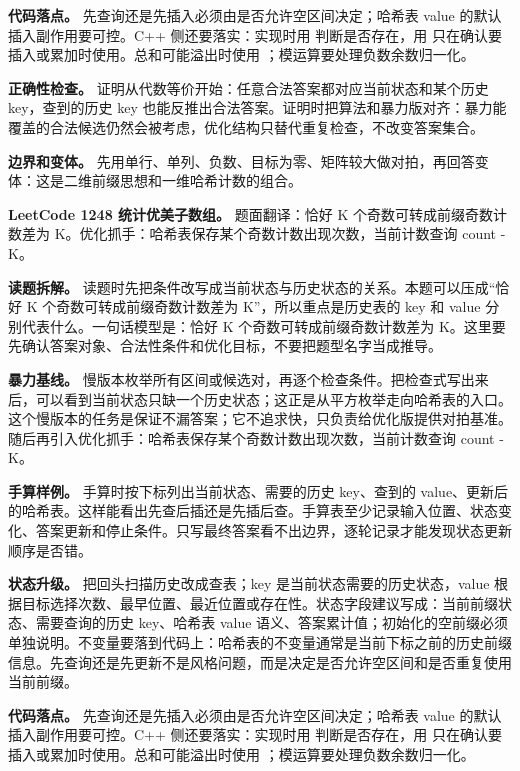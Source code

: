\textbf{代码落点。} 先查询还是先插入必须由是否允许空区间决定；哈希表 value 的默认插入副作用要可控。C++ 侧还要落实：实现时用  判断是否存在，用  只在确认要插入或累加时使用。总和可能溢出时使用 ；模运算要处理负数余数归一化。

\textbf{正确性检查。} 证明从代数等价开始：任意合法答案都对应当前状态和某个历史 key，查到的历史 key 也能反推出合法答案。证明时把算法和暴力版对齐：暴力能覆盖的合法候选仍然会被考虑，优化结构只替代重复检查，不改变答案集合。

\textbf{边界和变体。} 先用单行、单列、负数、目标为零、矩阵较大做对拍，再回答变体：这是二维前缀思想和一维哈希计数的组合。

\noindent\textbf{LeetCode 1248 统计优美子数组。} 题面翻译：恰好 K 个奇数可转成前缀奇数计数差为 K。优化抓手：哈希表保存某个奇数计数出现次数，当前计数查询 count - K。

\textbf{读题拆解。} 读题时先把条件改写成当前状态与历史状态的关系。本题可以压成“恰好 K 个奇数可转成前缀奇数计数差为 K”，所以重点是历史表的 key 和 value 分别代表什么。一句话模型是：恰好 K 个奇数可转成前缀奇数计数差为 K。这里要先确认答案对象、合法性条件和优化目标，不要把题型名字当成推导。

\textbf{暴力基线。} 慢版本枚举所有区间或候选对，再逐个检查条件。把检查式写出来后，可以看到当前状态只缺一个历史状态；这正是从平方枚举走向哈希表的入口。这个慢版本的任务是保证不漏答案；它不追求快，只负责给优化版提供对拍基准。随后再引入优化抓手：哈希表保存某个奇数计数出现次数，当前计数查询 count - K。

\textbf{手算样例。} 手算时按下标列出当前状态、需要的历史 key、查到的 value、更新后的哈希表。这样能看出先查后插还是先插后查。手算表至少记录输入位置、状态变化、答案更新和停止条件。只写最终答案看不出边界，逐轮记录才能发现状态更新顺序是否错。

\textbf{状态升级。} 把回头扫描历史改成查表；key 是当前状态需要的历史状态，value 根据目标选择次数、最早位置、最近位置或存在性。状态字段建议写成：当前前缀状态、需要查询的历史 key、哈希表 value 语义、答案累计值；初始化的空前缀必须单独说明。不变量要落到代码上：哈希表的不变量通常是当前下标之前的历史前缀信息。先查询还是先更新不是风格问题，而是决定是否允许空区间和是否重复使用当前前缀。

\textbf{代码落点。} 先查询还是先插入必须由是否允许空区间决定；哈希表 value 的默认插入副作用要可控。C++ 侧还要落实：实现时用  判断是否存在，用  只在确认要插入或累加时使用。总和可能溢出时使用 ；模运算要处理负数余数归一化。

